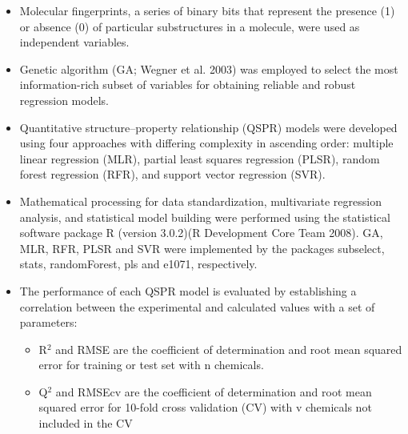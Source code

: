 \documentclass[10pt, letter]{report}
\renewcommand{\=}{\, =\, }
\newcommand{\+}{\, +\, }
\renewcommand{\-}{\, -\, }
\begin{document}
\begin{itemize}
\item Molecular fingerprints, a series of binary bits that represent the presence (1) or
absence (0) of particular substructures in a molecule, were used as independent
variables.
\item Genetic algorithm (GA; Wegner et al. 2003) was employed to select the most
information-rich subset of variables for obtaining reliable and robust regression
models.
\item Quantitative structure–property relationship (QSPR) models were developed
using four approaches with differing complexity in ascending order: multiple linear
regression (MLR), partial least squares regression (PLSR), random forest
regression (RFR), and support vector regression (SVR).
\item Mathematical processing for data standardization, multivariate regression
analysis, and statistical model building were performed using the statistical
software package R (version 3.0.2)(R Development Core Team 2008). GA, MLR,
RFR, PLSR and SVR were implemented by the packages subselect, stats,
randomForest, pls and e1071, respectively.
\item The performance of each QSPR model is evaluated by establishing a correlation
between the experimental and calculated values with a set of parameters:
\begin{itemize}
\item R\(^{2}\) and RMSE are the coefficient of determination and root mean squared
error for training or test set with n chemicals.
\item Q\(^{2}\) and RMSEcv are the coefficient of determination and root mean squared
error for 10-fold cross validation (CV) with v chemicals not included in the CV
\end{itemize}
\end{itemize}
\end{document}
